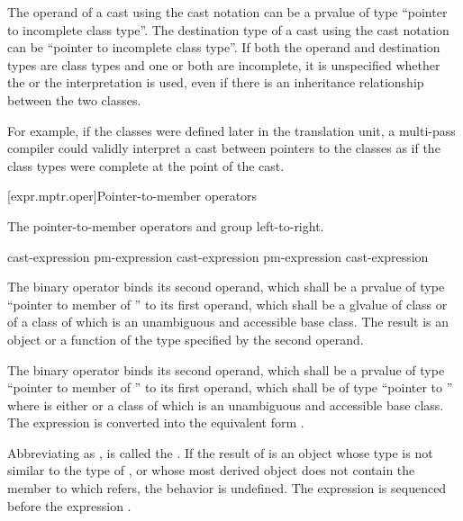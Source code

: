 \pnum
{}%
The operand of a cast using the cast notation can be a prvalue of type
``pointer to incomplete class type''. The destination type of a cast
using the cast notation can be ``pointer to incomplete class type''. If
both the operand and destination types are class types and one or both
are incomplete, it is unspecified whether the  or the
 interpretation is used, even if there is an
inheritance relationship between the two classes.
\begin{note}
For example, if the classes were defined later in the translation unit,
a multi-pass compiler could validly interpret a cast between
pointers to the classes as if the class types were complete at the point
of the cast.
\end{note}

[expr.mptr.oper]{Pointer-to-member operators}

\pnum
{}%
%
%
%
%
%
The pointer-to-member operators \tcode{->*} and  group
left-to-right.

\begin{bnf}
\br
    cast-expression\br
    pm-expression  cast-expression\br
    pm-expression \terminal{->*} cast-expression
\end{bnf}

\pnum
The binary operator  binds its second operand, which shall be
a prvalue
of type ``pointer to member of '' to its first operand, which shall be
a glvalue
of
class  or of a class of which  is an unambiguous and
accessible base class. The result is an object or a function of the type
specified by the second operand.

\pnum
The binary operator \tcode{->*} binds its second operand, which shall be
a prvalue
of type ``pointer to member of '' to its first operand, which shall be of
type ``pointer to ''
where  is either  or
a class of which 
is an unambiguous and accessible base class.
The expression  is converted into the equivalent form
.

\pnum
Abbreviating  as , 
is called the .
If the result of  is an object
whose type is not similar to the type of , or
whose most derived object does not
contain the member to which
 refers, the behavior is undefined.
The expression  is sequenced before the expression .

